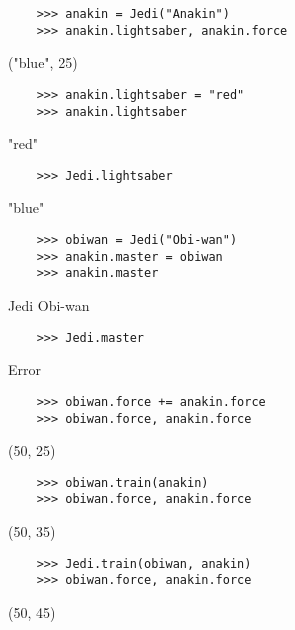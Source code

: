     \begin{blocksection}
    \begin{lstlisting}
    >>> anakin = Jedi("Anakin")
    >>> anakin.lightsaber, anakin.force
    \end{lstlisting}
    \begin{solution}[.2in]
    ("blue", 25)
    \end{solution}
    
    \begin{lstlisting}
    >>> anakin.lightsaber = "red"
    >>> anakin.lightsaber 
    \end{lstlisting}
    \begin{solution}[.2in]
    "red"
    \end{solution}
    
    \begin{lstlisting}
    >>> Jedi.lightsaber 
    \end{lstlisting}
    \begin{solution}[.2in]
    "blue"
    \end{solution}
    
    \begin{lstlisting}
    >>> obiwan = Jedi("Obi-wan")
    >>> anakin.master = obiwan
    >>> anakin.master
    \end{lstlisting}
    \begin{solution}[.2in]
    Jedi Obi-wan
    \end{solution}
    
    \begin{lstlisting}
    >>> Jedi.master
    \end{lstlisting}
    \begin{solution}[.2in]
    Error
    \end{solution}
    
    \begin{lstlisting}
    >>> obiwan.force += anakin.force
    >>> obiwan.force, anakin.force
    \end{lstlisting}
    \begin{solution}[.2in]
    (50, 25)
    \end{solution}
    
    \begin{lstlisting}
    >>> obiwan.train(anakin)
    >>> obiwan.force, anakin.force
    \end{lstlisting}
    \begin{solution}[.2in]
    (50, 35)
    \end{solution}
    
    \begin{lstlisting}
    >>> Jedi.train(obiwan, anakin)
    >>> obiwan.force, anakin.force
    \end{lstlisting}
    \begin{solution}[.2in]
    (50, 45)
    \end{solution}
    \end{blocksection}
    